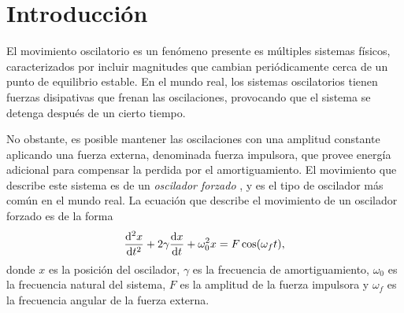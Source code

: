 \section*{Introducci\'on}
El movimiento oscilatorio es un fenómeno presente es múltiples sistemas físicos, caracterizados
por incluir magnitudes que cambian periódicamente cerca de un punto de equilibrio estable.
En el mundo real, los sistemas oscilatorios tienen fuerzas disipativas que frenan las
oscilaciones, provocando que el sistema se detenga después de un cierto tiempo.

No obstante, es posible mantener las oscilaciones con una amplitud constante aplicando una
fuerza externa, denominada fuerza impulsora, que provee energía adicional para compensar la
perdida por el amortiguamiento. El movimiento que describe este sistema es de un
\textit{oscilador forzado} \cite{zemansky}, y es el tipo de oscilador más común en el mundo
real. La ecuación que describe el movimiento de un oscilador forzado es de la forma
\begin{equation}\label{eq:ecuaciongeneral}
	\dv[2]{x}{t} +2\gamma\dv{x}{t}+\omega_0^2x=F\cos(\omega_f t),
\end{equation}
donde $x$ es la posición del oscilador, $\gamma$ es la frecuencia de amortiguamiento,
$\omega_0$ es la frecuencia natural del sistema, $F$ es la amplitud de la fuerza impulsora
y $\omega_f$ es la frecuencia angular de la fuerza externa.

